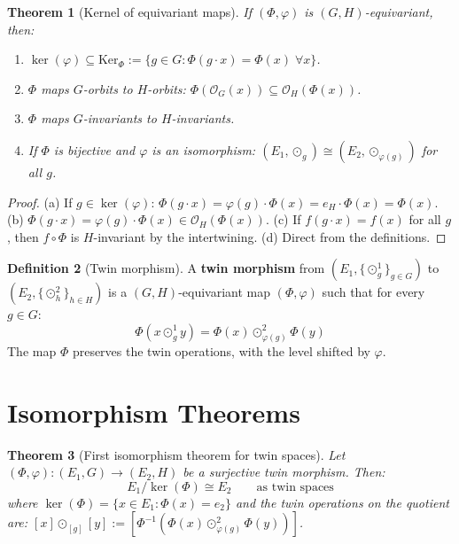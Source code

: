 \documentclass[12pt]{article}
\theoremstyle{plain}
\newtheorem{theorem}{Theorem}[section]
\theoremstyle{definition}
\newtheorem{definition}[theorem]{Definition}
\theoremstyle{remark}
\newcommand{\Ker}{\mathrm{Ker}}
\begin{document}
\begin{theorem}[Kernel of equivariant maps]\label{thm:kernel-equivariant}
If $(\Phi, \varphi)$ is $(G,H)$-equivariant, then:
\begin{enumerate}[label=(\alph*)]
    \item $\ker(\varphi) \subseteq \Ker_\Phi := \{g \in G : \Phi(g \cdot x) = \Phi(x)\;\forall x\}$.
    \item $\Phi$ maps $G$-orbits to $H$-orbits: $\Phi(\mathcal{O}_G(x)) \subseteq \mathcal{O}_H(\Phi(x))$.
    \item $\Phi$ maps $G$-invariants to $H$-invariants.
    \item If $\Phi$ is bijective and $\varphi$ is an isomorphism: $(E_1, \odot_g) \cong (E_2, \odot_{\varphi(g)})$ for all $g$.
\end{enumerate}
\end{theorem}

\begin{proof}
(a) If $g \in \ker(\varphi)$: $\Phi(g \cdot x) = \varphi(g) \cdot \Phi(x) = e_H \cdot \Phi(x) = \Phi(x)$.
(b) $\Phi(g \cdot x) = \varphi(g) \cdot \Phi(x) \in \mathcal{O}_H(\Phi(x))$.
(c) If $f(g \cdot x) = f(x)$ for all $g$, then $f \circ \Phi$ is $H$-invariant by the intertwining.
(d) Direct from the definitions.
\end{proof}

\begin{definition}[Twin morphism]\label{def:twin-morphism}
A \textbf{twin morphism} from $(E_1, \{\odot^1_g\}_{g \in G})$ to $(E_2, \{\odot^2_h\}_{h \in H})$ is a $(G,H)$-equivariant map $(\Phi, \varphi)$ such that for every $g \in G$:
\begin{equation}
\Phi(x \odot^1_g y) = \Phi(x) \odot^2_{\varphi(g)} \Phi(y)
\end{equation}
The map $\Phi$ preserves the twin operations, with the level shifted by $\varphi$.
\end{definition}


\section{Isomorphism Theorems}
\label{sec:isomorphisms}

\begin{theorem}[First isomorphism theorem for twin spaces]\label{thm:iso1}
Let $(\Phi, \varphi): (E_1, G) \to (E_2, H)$ be a surjective twin morphism. Then:
\begin{equation}
E_1 / \ker(\Phi) \cong E_2 \qquad \text{as twin spaces}
\end{equation}
where $\ker(\Phi) = \{x \in E_1 : \Phi(x) = e_2\}$ and the twin operations on the quotient are:
$[x] \odot_{[g]} [y] := [\Phi^{-1}(\Phi(x) \odot^2_{\varphi(g)} \Phi(y))]$.
\end{theorem}
\end{document}
